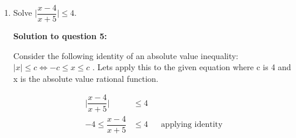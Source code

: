 \documentclass[12pt]{book}
\begin{document}
\begin{enumerate}
\vspace{1cm} 
\begin{center}
    Proof is on next page
\end{center}

\newpage
\textbf{prove question 4 by substituting x=1 back into the original equation:}\\

\begin{proof}
    \begin{align*}
        LHS &= \dfrac{7}{x+2} + \dfrac{5}{x-2} \\
        &= \dfrac{7}{1+2} + \dfrac{5}{1-2} && \text{Substitute x as 1} \\
        &= \dfrac{7}{3} + \dfrac{5}{-1} && \text{Simplify} \\
        &= \dfrac{7}{3} + \dfrac{-15}{3} \\
        LHS &= -\dfrac{8}{3}
    \end{align*}

    \begin{align*}
        RHS &= \dfrac{10x-2}{x^2 - 4} \\
        &= \dfrac{10\times 1-2}{1^2 - 4} && \text{Substitute x as 1} \\
        &= \dfrac{10-2}{1 - 4} && \text{Simplify}\\
        RHS &= -\dfrac{8}{3}\\
        RHS & =LHS && \qedhere
    \end{align*}
\end{proof}

$\therefore$ the answer is correct. 

\newpage

\item Solve $\bigg|\dfrac{x-4}{x+5}\bigg| \le 4$.

\vspace{0.3cm} 
\textbf{Solution to question 5:}

\vspace{0.5cm}
 Consider the following identity of an absolute value inequality: $|x| \leq c \Longleftrightarrow -c \leq x \leq c$
 . Lets apply this to the given equation where c is 4 and x is the absolute value rational function.
 \vspace{-0.3cm}

 \begin{align*}
    \bigg|\dfrac{x-4}{x+5}\bigg| &\le 4 \\
    -4 \le \dfrac{x-4}{x+5} & \le 4 && \text{applying identity}
 \end{align*}


\end{enumerate}
\end{document}
